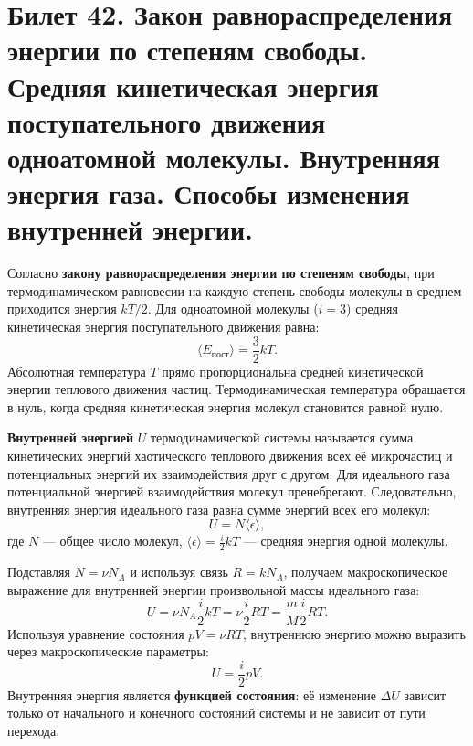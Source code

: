 \section{Билет 42. Закон равнораспределения энергии по степеням свободы. Средняя кинетическая энергия поступательного движения одноатомной молекулы. Внутренняя энергия газа. Способы изменения внутренней энергии.}

\begin{definition}
Согласно \textbf{закону равнораспределения энергии по степеням свободы}, при термодинамическом равновесии на каждую степень свободы молекулы в среднем приходится энергия $kT/2$. Для одноатомной молекулы ($i=3$) средняя кинетическая энергия поступательного движения равна:
\begin{equation}
    \langle E_{\text{пост}} \rangle = \frac{3}{2} k T. \label{eq:mono_energy_42}
\end{equation}
Абсолютная температура $T$ прямо пропорциональна средней кинетической энергии теплового движения частиц. Термодинамическая температура обращается в нуль, когда средняя кинетическая энергия молекул становится равной нулю.
\end{definition}

\begin{definition}
\textbf{Внутренней энергией} $U$ термодинамической системы называется сумма кинетических энергий хаотического теплового движения всех её микрочастиц и потенциальных энергий их взаимодействия друг с другом.
Для идеального газа потенциальной энергией взаимодействия молекул пренебрегают. Следовательно, внутренняя энергия идеального газа равна сумме энергий всех его молекул:
\begin{equation}
    U = N \langle \epsilon \rangle,
\end{equation}
где $N$ --- общее число молекул, $\langle \epsilon \rangle = \frac{i}{2} k T$ --- средняя энергия одной молекулы.
\end{definition}

\begin{theorem}
Подставляя $N = \nu N_A$ и используя связь $R = k N_A$, получаем макроскопическое выражение для внутренней энергии произвольной массы идеального газа:
\begin{equation}
    U = \nu N_A \frac{i}{2} k T = \nu \frac{i}{2} R T = \frac{m}{M} \frac{i}{2} R T. \label{eq:internal_energy_42}
\end{equation}
Используя уравнение состояния $pV = \nu RT$, внутреннюю энергию можно выразить через макроскопические параметры:
\begin{equation}
    U = \frac{i}{2} p V. \label{eq:U_pV_42}
\end{equation}
Внутренняя энергия является \textbf{функцией состояния}: её изменение $\Delta U$ зависит только от начального и конечного состояний системы и не зависит от пути перехода.
\end{theorem}


